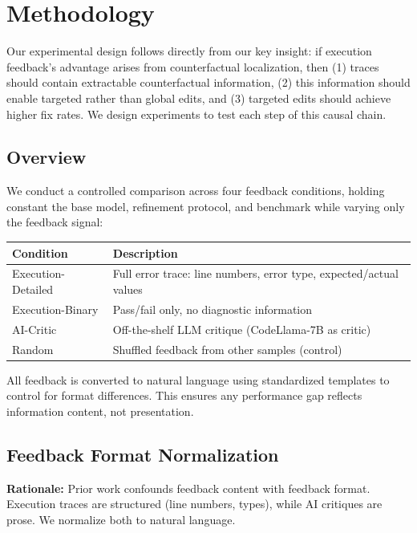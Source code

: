 \section{Methodology}
\label{sec:methodology}

Our experimental design follows directly from our key insight: if execution feedback's advantage arises from counterfactual localization, then (1) traces should contain extractable counterfactual information, (2) this information should enable targeted rather than global edits, and (3) targeted edits should achieve higher fix rates. We design experiments to test each step of this causal chain.

\subsection{Overview}

We conduct a controlled comparison across four feedback conditions, holding constant the base model, refinement protocol, and benchmark while varying only the feedback signal:

\begin{table}[h]
\centering
\begin{tabular}{@{}ll@{}}
\toprule
\textbf{Condition} & \textbf{Description} \\
\midrule
Execution-Detailed & Full error trace: line numbers, error type, expected/actual values \\
Execution-Binary & Pass/fail only, no diagnostic information \\
AI-Critic & Off-the-shelf LLM critique (CodeLlama-7B as critic) \\
Random & Shuffled feedback from other samples (control) \\
\bottomrule
\end{tabular}
\end{table}

All feedback is converted to natural language using standardized templates to control for format differences. This ensures any performance gap reflects information content, not presentation.

\subsection{Feedback Format Normalization}

\textbf{Rationale:} Prior work confounds feedback content with feedback format. Execution traces are structured (line numbers, types), while AI critiques are prose. We normalize both to natural language.

